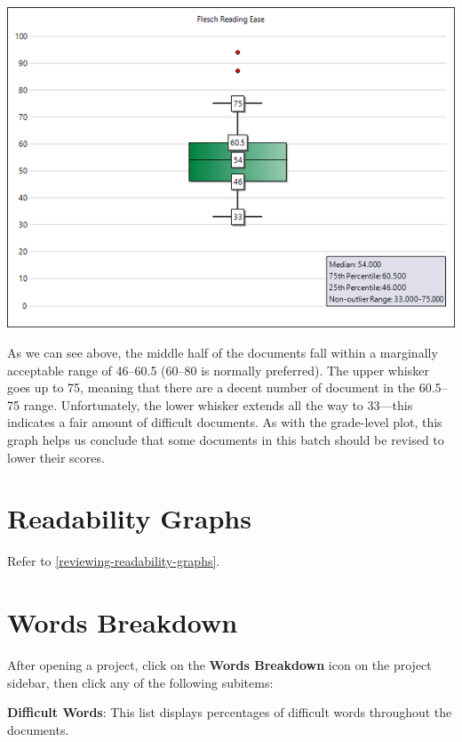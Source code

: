 \documentclass[
]{book}
\theoremstyle{definition}
\theoremstyle{definition}
\theoremstyle{definition}
\theoremstyle{definition}
\theoremstyle{remark}
\begin{document}
\begin{center}\includegraphics[width=0.75\linewidth,]{Images/boxindex} \end{center}

As we can see above, the middle half of the documents fall within a marginally acceptable range of 46--60.5 (60--80 is normally preferred). The upper whisker goes up to 75, meaning that there are a decent number of document in the 60.5--75 range. Unfortunately, the lower whisker extends all the way to 33---this indicates a fair amount of difficult documents. As with the grade-level plot, this graph helps us conclude that some documents in this batch should be revised to lower their scores.

\hypertarget{batch-readability-graphs}{%
\section{Readability Graphs}\label{batch-readability-graphs}}

Refer to \ref{reviewing-readability-graphs}.

\hypertarget{reviewing-batch-words}{%
\section{Words Breakdown}\label{reviewing-batch-words}}

After opening a project, click on the \textbf{Words Breakdown} icon on the project sidebar, then click any of the following subitems:

\textbf{Difficult Words}: This list displays percentages of difficult words throughout the documents.
\end{document}
